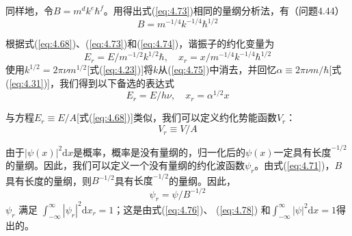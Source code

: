     同样地，令$B = m^dk^e\hbar^f$。用得出式(\ref{eq:4.73})相同的量纲分析法，有（问题4.44）
    \begin{equation}
        B = m^{-1/4}k^{-1/4}\hbar^{1/2}
        \label{eq:4.74}
    \end{equation}

    根据式(\ref{eq:4.68})、(\ref{eq:4.73})和(\ref{eq:4.74})，谐振子的约化变量为
    \begin{equation}
        E_r = E / m^{-1/2}k^{1/2}\hbar, \quad x_r = x / m^{-1/4}k^{-1/4}\hbar^{1/2}
        \label{eq:4.75}
    \end{equation}
    使用$k^{1/2} = 2\pi\nu m^{1/2}$[式(\ref{eq:4.23})]将$k$从(\ref{eq:4.75})中消去，并回忆$\alpha \equiv 2\pi\nu m/\hbar$[式(\ref{eq:4.31})]，我们得到以下备选的表达式
    \begin{equation}
        E_r = E /h\nu, \quad x_r = \alpha ^{1/2}x
        \label{eq:4.76}
    \end{equation}

    与方程$E_r \equiv E/A$[式(\ref{eq:4.68})]类似，我们可以定义约化势能函数$V_r$：
    \begin{equation}
        V_r \equiv V / A
        \label{eq:4.77}
    \end{equation}

    由于$\left|\psi\left(x\right)\right|^2\mathrm{d}x$是概率，概率是没有量纲的，归一化后的$\psi\left(x\right)$一定具有$\text{长度}^{-1/2}$的量纲。因此，我们可以定义一个没有量纲的约化波函数$\psi_r$。由式(\ref{eq:4.71})，$B$具有长度的量纲，则$B^{-1/2}$具有$\text{长度}^{-1/2}$的量纲。因此，
    \begin{equation}
        \psi_r = \psi / B^{-1/2}
        \label{eq:4.78}
    \end{equation}
    $\psi_r$ 满足 $\int_{-\infty}^{\infty} \left|\psi_r\right|^2\mathrm{d}x_r = 1$；这是由式(\ref{eq:4.76})、 (\ref{eq:4.78}) 和$\int_{-\infty}^{\infty} \left|\psi\right|^2\mathrm{d}x = 1$得出的。


